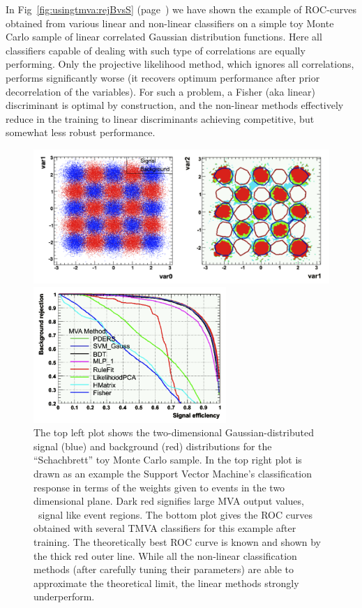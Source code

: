 In Fig~\ref{fig:usingtmva:rejBvsS} (page~\pageref{fig:usingtmva:rejBvsS}) 
we have shown the example of ROC-curves obtained from various linear and non-linear classifiers 
on a simple toy Monte Carlo sample of linear correlated Gaussian distribution functions. 
Here all classifiers capable of dealing with such type of correlations
are equally performing. Only the projective likelihood method, which ignores all correlations,
performs significantly worse (it recovers optimum performance after prior decorrelation
of the variables). For such a problem, a Fisher (aka linear) discriminant is optimal by 
construction, and the non-linear methods effectively reduce in the training to linear discriminants
achieving competitive, but somewhat less robust performance. 
\begin{figure}[p]
\begin{center}
  \includegraphics[width=1.00\textwidth]{plots/Schachbrett_both.png}

  \vspace{0.5cm}
  \includegraphics[width=0.65\textwidth]{plots/Schachbrett_ROC.png}
\end{center}
\caption[.]{The top left plot shows the two-dimensional Gaussian-distributed 
  signal (blue) and background (red) distributions for the ``Schachbrett'' toy 
  Monte Carlo sample. In the top right plot is drawn as an example the Support Vector
  Machine's classification response in terms of the weights given to events in
  the two dimensional plane. Dark red signifies large MVA output values,
  \ie\   signal like event regions. The bottom plot gives the ROC curves 
  obtained with several TMVA classifiers for this example after training. 
  The theoretically best ROC curve is known and shown by the thick red outer
  line.  While all the non-linear classification methods (after
  carefully tuning their parameters) are able to approximate the
  theoretical limit, the linear methods strongly underperform. }
\label{fig:conclusions:schachbrett}
\end{figure}

